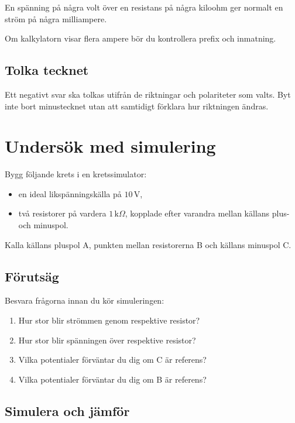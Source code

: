 \documentclass[
  swedish,
  11pt,
  a4paper,
  DIV=11,
  numbers=noendperiod,
  twoside,
  open=any]{scrreprt}
\begin{document}
En spänning på några volt över en resistans på några kiloohm ger normalt
en ström på några milliampere.

Om kalkylatorn visar flera ampere bör du kontrollera prefix och
inmatning.

\subsection{Tolka tecknet}\label{sec-grunder-tolka-tecknet}

Ett negativt svar ska tolkas utifrån de riktningar och polariteter som
valts. Byt inte bort minustecknet utan att samtidigt förklara hur
riktningen ändras.

\section{Undersök med
simulering}\label{sec-grunder-undersok-med-simulering}

Bygg följande krets i en kretssimulator:

\begin{itemize}
\item
  en ideal likspänningskälla på \(10\,\mathrm{V}\),
\item
  två resistorer på vardera \(1\,\mathrm{k}\Omega\), kopplade efter
  varandra mellan källans plus- och minuspol.
\end{itemize}

Kalla källans pluspol A, punkten mellan resistorerna B och källans
minuspol C.

\subsection{Förutsäg}\label{sec-grunder-forutsag}

Besvara frågorna innan du kör simuleringen:

\begin{enumerate}
\def\labelenumi{\arabic{enumi}.}
\item
  Hur stor blir strömmen genom respektive resistor?
\item
  Hur stor blir spänningen över respektive resistor?
\item
  Vilka potentialer förväntar du dig om C är referens?
\item
  Vilka potentialer förväntar du dig om B är referens?
\end{enumerate}

\subsection{Simulera och jämför}\label{sec-grunder-simulera-och-jamfor}
\end{document}
